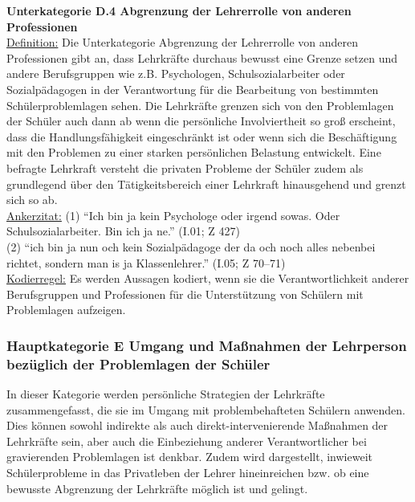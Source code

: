 \textbf{Unterkategorie D.4 Abgrenzung der Lehrerrolle von anderen Professionen}\\
\underline{Definition:} Die Unterkategorie Abgrenzung der Lehrerrolle von anderen Professionen gibt an, dass Lehrkräfte durchaus bewusst eine Grenze setzen und andere Berufsgruppen wie z.B. Psychologen, Schulsozialarbeiter oder Sozialpädagogen in der Verantwortung für die Bearbeitung von bestimmten Schülerproblemlagen sehen. Die Lehrkräfte grenzen sich von den Problemlagen der Schüler auch dann ab wenn die persönliche Involviertheit so groß erscheint, dass die Handlungsfähigkeit eingeschränkt ist oder wenn sich die Beschäftigung mit den Problemen zu einer starken persönlichen Belastung entwickelt. Eine befragte Lehrkraft versteht die privaten Probleme der Schüler zudem als grundlegend über den Tätigkeitsbereich einer Lehrkraft hinausgehend und grenzt sich so ab.\\
\underline{Ankerzitat:} (1) "`Ich bin ja kein Psychologe oder irgend sowas. Oder Schulsozialarbeiter. Bin ich ja ne."' (I.01; Z 427)\\ (2) "`ich bin ja nun och kein Sozialpädagoge der da och noch alles nebenbei richtet, sondern man is ja Klassenlehrer."' (I.05; Z 70--71)\\
\underline{Kodierregel:} Es werden Aussagen kodiert, wenn sie die Verantwortlichkeit anderer Berufsgruppen und Professionen für die Unterstützung von Schülern mit Problemlagen aufzeigen.\\

\subsubsection{Hauptkategorie E Umgang und Maßnahmen der Lehrperson bezüglich der Problemlagen der Schüler}
\label{sec:HauptkategorieEUmgangUndMassnahmenDerLehrpersonBezüglichDerProblemlagenDerSchüler}

In dieser Kategorie werden persönliche Strategien der Lehrkräfte zusammengefasst, die sie im Umgang mit problembehafteten Schülern anwenden. Dies können sowohl indirekte als auch direkt-intervenierende Maßnahmen der Lehrkräfte sein, aber auch die Einbeziehung anderer Verantwortlicher bei gravierenden Problemlagen ist denkbar. Zudem wird dargestellt, inwieweit Schülerprobleme in das Privatleben der Lehrer hineinreichen bzw. ob eine bewusste Abgrenzung der Lehrkräfte möglich ist und gelingt.\\

